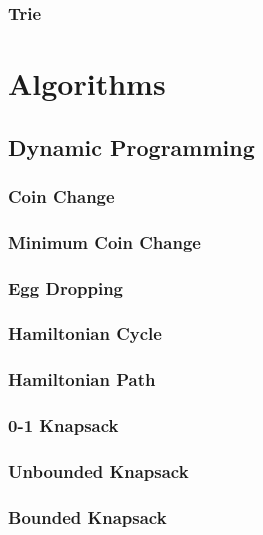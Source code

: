 \documentclass[8pt]{article}
\begin{document}
\subsubsection{Trie}


\section{Algorithms}
\subsection{Dynamic Programming}
\subsubsection{Coin Change}

\subsubsection{Minimum Coin Change}

\subsubsection{Egg Dropping}

\subsubsection{Hamiltonian Cycle}

\subsubsection{Hamiltonian Path}

\subsubsection{0-1 Knapsack}

\subsubsection{Unbounded Knapsack}

\subsubsection{Bounded Knapsack}

\end{document}
